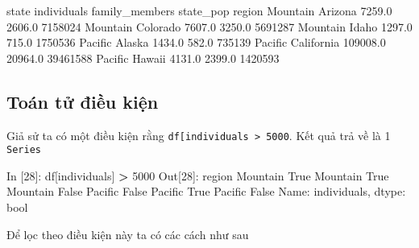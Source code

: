 \documentclass[
]{book}
\newenvironment{Shaded}{\begin{snugshade}}{\end{snugshade}}
\newcommand{\BuiltInTok}[1]{#1}
\newcommand{\DecValTok}[1]{\textcolor[rgb]{0.00,0.00,0.81}{#1}}
\newcommand{\FloatTok}[1]{\textcolor[rgb]{0.00,0.00,0.81}{#1}}
\newcommand{\NormalTok}[1]{#1}
\newcommand{\OperatorTok}[1]{\textcolor[rgb]{0.81,0.36,0.00}{\textbf{#1}}}
\newcommand{\StringTok}[1]{\textcolor[rgb]{0.31,0.60,0.02}{#1}}
\newcommand{\VariableTok}[1]{\textcolor[rgb]{0.00,0.00,0.00}{#1}}
\begin{document}
\begin{Shaded}
\begin{Highlighting}[]
\NormalTok{               state  individuals  family\_members  state\_pop}
\NormalTok{region                                                      }
\NormalTok{Mountain     Arizona       }\FloatTok{7259.0}          \FloatTok{2606.0}    \DecValTok{7158024}
\NormalTok{Mountain    Colorado       }\FloatTok{7607.0}          \FloatTok{3250.0}    \DecValTok{5691287}
\NormalTok{Mountain       Idaho       }\FloatTok{1297.0}           \FloatTok{715.0}    \DecValTok{1750536}
\NormalTok{Pacific       Alaska       }\FloatTok{1434.0}           \FloatTok{582.0}     \DecValTok{735139}
\NormalTok{Pacific   California     }\FloatTok{109008.0}         \FloatTok{20964.0}   \DecValTok{39461588}
\NormalTok{Pacific       Hawaii       }\FloatTok{4131.0}          \FloatTok{2399.0}    \DecValTok{1420593}
\end{Highlighting}
\end{Shaded}

\subsection{Toán tử điều kiện}\label{touxe1n-tux1eed-ux111iux1ec1u-kiux1ec7n}

Giả sử ta có một điều kiện rằng \texttt{df{[}\textquotesingle{}individuals\textquotesingle{}{]}\ \textgreater{}\ 5000}. Kết quả trả về là 1 \texttt{Series}

\begin{Shaded}
\begin{Highlighting}[]
\NormalTok{In [}\DecValTok{28}\NormalTok{]: df[}\StringTok{\textquotesingle{}individuals\textquotesingle{}}\NormalTok{] }\OperatorTok{\textgreater{}} \DecValTok{5000}
\NormalTok{Out[}\DecValTok{28}\NormalTok{]:}
\NormalTok{region}
\NormalTok{Mountain     }\VariableTok{True}
\NormalTok{Mountain     }\VariableTok{True}
\NormalTok{Mountain    }\VariableTok{False}
\NormalTok{Pacific     }\VariableTok{False}
\NormalTok{Pacific      }\VariableTok{True}
\NormalTok{Pacific     }\VariableTok{False}
\NormalTok{Name: individuals, dtype: }\BuiltInTok{bool}
\end{Highlighting}
\end{Shaded}

Để lọc theo điều kiện này ta có các cách như sau
\end{document}
